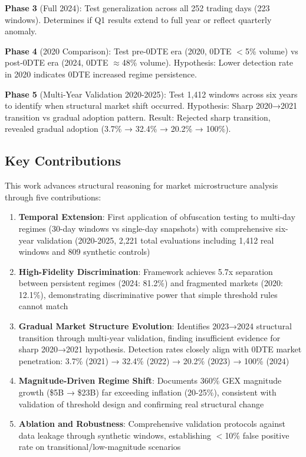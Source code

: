 \textbf{Phase 3} (Full 2024): Test generalization across all 252 trading days (223 windows). Determines if Q1 results extend to full year or reflect quarterly anomaly.

\textbf{Phase 4} (2020 Comparison): Test pre-0DTE era (2020, 0DTE $<$5\% volume) vs post-0DTE era (2024, 0DTE $\approx$48\% volume). Hypothesis: Lower detection rate in 2020 indicates 0DTE increased regime persistence.

\textbf{Phase 5} (Multi-Year Validation 2020-2025): Test 1,412 windows across six years to identify when structural market shift occurred. Hypothesis: Sharp 2020→2021 transition vs gradual adoption pattern. Result: Rejected sharp transition, revealed gradual adoption (3.7\% → 32.4\% → 20.2\% → 100\%).

\subsection{Key Contributions}

This work advances structural reasoning for market microstructure analysis through five contributions:

\begin{enumerate}
\item \textbf{Temporal Extension}: First application of obfuscation testing to multi-day regimes (30-day windows vs single-day snapshots) with comprehensive six-year validation (2020-2025, 2,221 total evaluations including 1,412 real windows and 809 synthetic controls)
\item \textbf{High-Fidelity Discrimination}: Framework achieves 5.7x separation between persistent regimes (2024: 81.2\%) and fragmented markets (2020: 12.1\%), demonstrating discriminative power that simple threshold rules cannot match
\item \textbf{Gradual Market Structure Evolution}: Identifies 2023→2024 structural transition through multi-year validation, finding insufficient evidence for sharp 2020→2021 hypothesis. Detection rates closely align with 0DTE market penetration: 3.7\% (2021) → 32.4\% (2022) → 20.2\% (2023) → 100\% (2024)
\item \textbf{Magnitude-Driven Regime Shift}: Documents 360\% GEX magnitude growth (\$5B → \$23B) far exceeding inflation (20-25\%), consistent with validation of threshold design and confirming real structural change
\item \textbf{Ablation and Robustness}: Comprehensive validation protocols against data leakage through synthetic windows, establishing $<$10\% false positive rate on transitional/low-magnitude scenarios
\end{enumerate}

